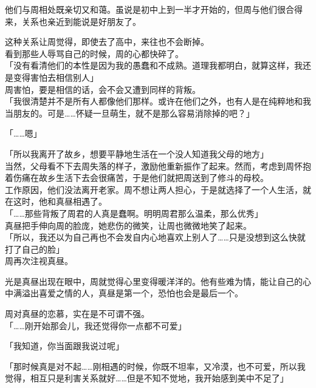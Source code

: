 他们与周相处既亲切又和蔼。虽说是初中上到一半才开始的，但周与他们很合得来，关系也亲近到能说是好朋友了。

这种关系让周觉得，即使去了高中，来往也不会断掉。\\

看到那些人辱骂自己的时候，周的心都快碎了。\\

「没有看清他们的本性是因为我的愚蠢和不成熟。道理我都明白，就算这样，我还是变得害怕去相信别人」\\

周害怕，要是相信的话，会不会又遭到同样的背叛。\\

「我很清楚并不是所有人都像他们那样。或许在他们之外，也有人是在纯粹地和我当朋友的。可是……怀疑一旦萌生，就不是那么容易消除掉的吧？」

「……嗯」

「所以我离开了故乡，想要平静地生活在一个没人知道我父母的地方」\\

当然，父母看不下去周失落的样子，激励他重新振作了起来。然而，考虑到周怀抱着伤痛在故乡生活下去会很痛苦，于是他们就把周送到了修斗的母校。\\

工作原因，他们没法离开老家。周不想让两人担心，于是就选择了一个人生活，就在这时，他和真昼相遇了。\\

「……那些背叛了周君的人真是蠢啊。明明周君那么温柔，那么优秀」\\

真昼把手伸向周的脸庞，她悲伤的微笑，让周也微微地笑了起来。\\

「所以，我还以为自己再也不会发自内心地喜欢上别人了……只是没想到这么快就打了自己的脸」\\

周再次注视真昼。

光是真昼出现在眼中，周就觉得心里变得暖洋洋的。他有些难为情，能让自己的心中满溢出喜爱之情的人，真昼是第一个，恐怕也会是最后一个。

周对真昼的恋慕，实在是不可谓不强。\\

「……刚开始那会儿，我还觉得你一点都不可爱」

「我知道，你当面跟我说过呢」

「那时候真是对不起……刚相遇的时候，你既不坦率，又冷漠，也不可爱，所以我觉得，相互只是利害关系就好……但是不知不觉地，我开始感到美中不足了」\\

